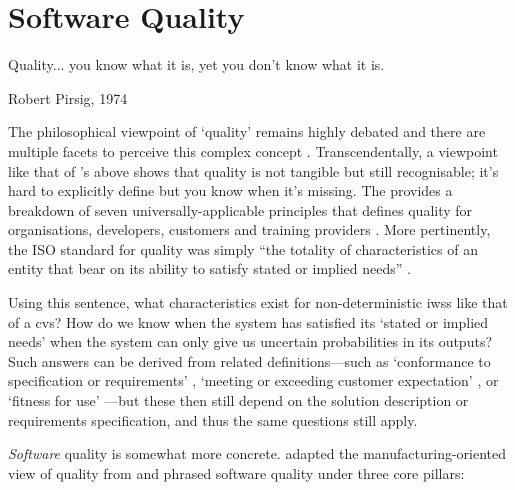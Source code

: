 \section{Software Quality}
\label{sec:background:software-quality}

\epigraph{Quality... you know what it is, yet you don't know what it is.}{Robert Pirsig, 1974 \citep{Pirsig:1974vs}}

\noindent
The philosophical viewpoint of `quality' remains highly debated and there are multiple facets to perceive this complex concept \citep{Garvin:1984vf}. Transcendentally, a viewpoint like that of \citeauthor{Pirsig:1974vs}'s above shows that quality is not tangible but still recognisable; it's hard to explicitly define but you know when it's missing. The \citeauthor{ISO8402:1986} provides a breakdown of seven universally-applicable principles that defines quality for organisations, developers, customers and training providers \citep{ISO9000:2015}. More pertinently, the \citeyear{ISO8402:1986} ISO standard for quality was simply ``the totality of characteristics of an entity that bear on its ability to satisfy stated or implied needs'' \citep{ISO8402:1986}.

Using this sentence, what characteristics exist for non-deterministic \glspl{iws} like that of a \gls{cvs}? How do we know when the system has satisfied its `stated or implied needs' when the system can only give us uncertain probabilities in its outputs? Such answers can be derived from related definitions---such as `conformance to specification or requirements' \citep{Gilmore:1974um,Crosby:1979uy}, `meeting or exceeding customer expectation' \citep{Parasuraman:1988wh}, or `fitness for use' \citep{Juran:1988tg}---but these then still depend on the solution description or requirements specification, and thus the same questions still apply.

\textit{Software} quality is somewhat more concrete. \citet{Pressman:2005vf} adapted the manufacturing-oriented view of quality from \citep{Bessin:2004vc} and phrased software quality under three core pillars:

